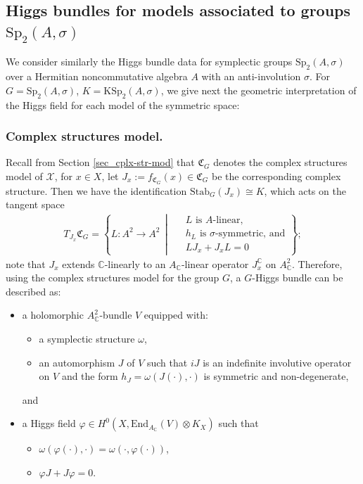 \documentclass[oneside,11pt]{amsart}
\theoremstyle{definition}
\theoremstyle{remark}
\newcommand{\midwd}{\,\middle\vert\,}
\numberwithin{thm}{section}
\numberwithin{equation}{section}
\begin{document}
\subsection{Higgs bundles for models associated to groups \texorpdfstring{$\mathrm{Sp}_2(A, \sigma)$}{}}\label{subsec:real_defs}

We consider similarly the Higgs bundle data for symplectic groups $\mathrm{Sp}_{2}(A,\sigma )$ over a Hermitian noncommutative algebra $A$ with an anti-involution $\sigma$. For $G=\mathrm{Sp}_2(A, \sigma)$, $K=\mathrm{KSp}_2(A, \sigma)$, we give next the geometric interpretation of the Higgs field for each model of the symmetric space: 

\subsubsection{Complex structures model.}\label{G-Higgs in cx_str_model}

Recall from Section \ref{sec_cplx-str-mod} that $\mathfrak{C}_G$ denotes the complex structures model of $\mathcal{X}$, for $x\in X$, let $J_x:=f_{\mathfrak{C}_G}(x)\in\mathfrak{C}_G$ be the corresponding complex structure. Then we have the identification $\mathrm{Stab}_G(J_x)\cong K$, which acts on the tangent space
\begin{align*}
        T_{J_x}\mathfrak{C}_G=\left\{
        L\colon A^2\to A^2\midwd 
        \begin{aligned}
            &\ L \text{ is } A\text{-linear},\\
            &\ h_L \text{ is } \sigma\text{-symmetric, and}\\
            &\ LJ_{x}+J_{x}L=0
        \end{aligned}
        \right\};
    \end{align*}
note that $J_x$ extends $\mathbb{C}$-linearly to an $A_{\mathbb C}$-linear operator $J_{x}^{\mathbb{C}}$ on $A_{\mathbb{C}}^2$. Therefore, using the complex structures model for the group $G$, a $G$-Higgs bundle can be described as: 
\begin{itemize}
    \item a holomorphic $A^2_{\mathbb{C}}$-bundle $V$ equipped with: 
    \begin{itemize}
        \item a symplectic structure $\omega$,
        \item an automorphism $J$ of $V$ such that $iJ$ is an indefinite involutive operator on $V$ and the form $h_J=\omega(J(\cdot),\cdot)$ is symmetric and non-degenerate,
    \end{itemize}
    and
    \item a Higgs field $\varphi\in H^0(X,\mathrm{End}_{A_\mathbb C}(V)\otimes K_X)$ such that 
    \begin{itemize}
        \item $\omega(\varphi(\cdot),\cdot)=\omega(\cdot,\varphi(\cdot))$,  
        \item $\varphi J+J\varphi=0$.
        \end{itemize}
\end{itemize}
\end{document}
